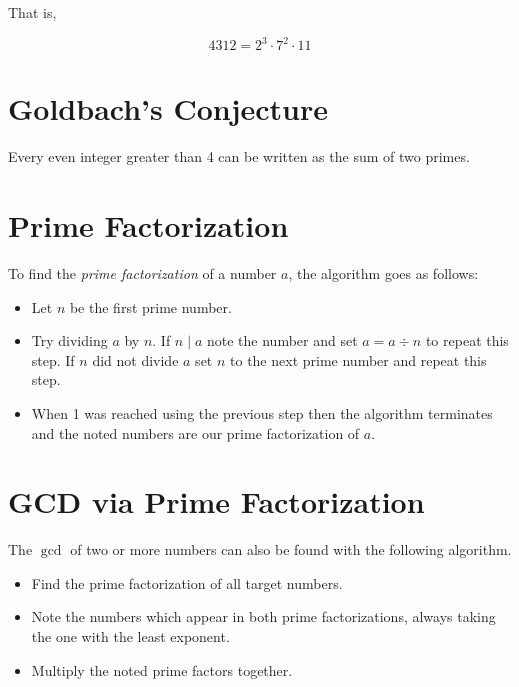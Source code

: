 That is,

\[
	4312 = 2^3 \cdot 7^2 \cdot 11
\]

\section{Goldbach's Conjecture}

Every even integer greater than 4 can be written as the sum of two primes.

\section{Prime Factorization}

To find the \emph{prime factorization} of a number \(a\), the algorithm goes as follows:

\begin{itemize}

	\item Let \(n\) be the first prime number.

	\item  Try dividing \(a\) by \(n\). If \(n \mid a\) note the number and set \(a = a \div n\) to repeat this step. If \(n\)
	      did not divide \(a\) set \(n\) to the next prime number and repeat this step.

	\item When 1 was reached using the previous step then the algorithm terminates and the noted numbers are our prime factorization
	      of \(a\).

\end{itemize}

\section{GCD via Prime Factorization}

The \(\gcd\) of two or more numbers can also be found with the following algorithm.

\begin{itemize}

	\item Find the prime factorization of all target numbers.

	\item Note the numbers which appear in both prime factorizations, always taking the one with the least exponent.

	\item Multiply the noted prime factors together.

\end{itemize}

